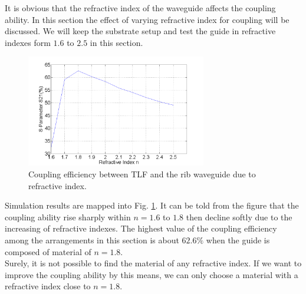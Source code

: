 It is obvious that the refractive index of the waveguide affects the coupling ability. In this section the effect of varying refractive index for coupling will be discussed. 
We will keep the substrate setup and test the guide in refractive indexes form $1.6$ to $2.5$ in this section.\\

\begin{figure}[!ht]
\centering
\includegraphics[width=0.7\textwidth]{bilder/s21_refractive_index}
\caption{Coupling efficiency between TLF and the rib waveguide due to refractive index.}
\label{fig:refractive_index}
\end{figure}

Simulation results are mapped into Fig. \ref{fig:refractive_index}. It can be told from the figure that the coupling ability rise sharply within $n=1.6$ to $1.8$ then decline softly due to the increasing of refractive indexes. The highest value of the coupling efficiency among the arrangements in this section is about $62.6\%$ when the guide is composed of material of $n=1.8$.\\
Surely, it is not possible to find the material of any refractive index. If we want to improve the coupling ability by this means, we can only choose a material with a refractive index close to $n=1.8$.
